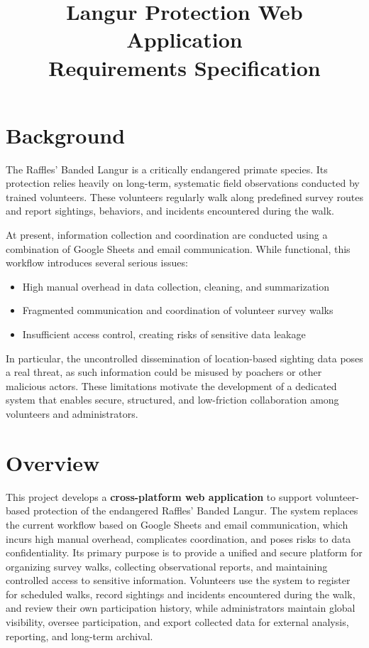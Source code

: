 \documentclass[11pt]{article}
\title{Langur Protection Web Application\\
\large Requirements Specification}
\author{}
\date{}
\begin{document}
\maketitle

\section{Background}

The Raffles' Banded Langur is a critically endangered primate species.
Its protection relies heavily on long-term, systematic field observations conducted by trained volunteers.
These volunteers regularly walk along predefined survey routes and report sightings, behaviors, and incidents encountered during the walk.

At present, information collection and coordination are conducted using a combination of Google Sheets and email communication.
While functional, this workflow introduces several serious issues:
\begin{itemize}
    \item High manual overhead in data collection, cleaning, and summarization
    \item Fragmented communication and coordination of volunteer survey walks
    \item Insufficient access control, creating risks of sensitive data leakage
\end{itemize}

In particular, the uncontrolled dissemination of location-based sighting data poses a real threat, as such information could be misused by poachers or other malicious actors.
These limitations motivate the development of a dedicated system that enables secure, structured, and low-friction collaboration among volunteers and administrators.

\section{Overview}

This project develops a \textbf{cross-platform web application} to support volunteer-based protection of the endangered Raffles' Banded Langur. The system replaces the current workflow based on Google Sheets and email communication, which incurs high manual overhead, complicates coordination, and poses risks to data confidentiality. Its primary purpose is to provide a unified and secure platform for organizing survey walks, collecting observational reports, and maintaining controlled access to sensitive information. Volunteers use the system to register for scheduled walks, record sightings and incidents encountered during the walk, and review their own participation history, while administrators maintain global visibility, oversee participation, and export collected data for external analysis, reporting, and long-term archival.
\end{document}
